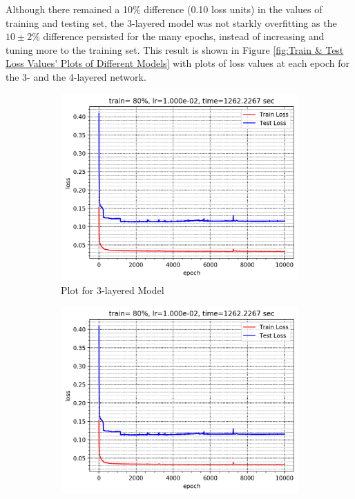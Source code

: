 \documentclass[12pt]{article}
\begin{document}
    Although there remained a 10\% difference (0.10 loss units) in the values of training and testing set, the 3-layered model was not starkly overfitting as the $10\pm2\%$ difference persisted for the many epochs, instead of increasing and tuning more to the training set. This result is shown in Figure \ref{fig:Train & Test Loss Values' Plots of Different Models} with plots of loss values at each epoch for the 3- and the 4-layered network.
    \begin{figure}[h]
        \centering
        \begin{subfigure}{.49\textwidth}
            \centering
            \includegraphics[width=\textwidth]{weights_train_test_loss_plot}
            \caption{Plot for 3-layered Model}
            \label{fig:Plot for 3-layered Model}
        \end{subfigure}
        \begin{subfigure}{.49\textwidth}
            \centering
            \includegraphics[width=\textwidth]{weights_train_test_loss_plot}

\end{subfigure}
\end{figure}
\end{document}

